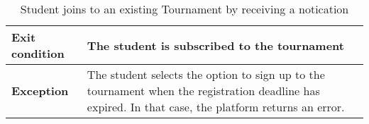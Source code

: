 \begin{enumerate}[label=\textbf{UC\arabic*}:,ref=UC\arabic*,leftmargin=1.3cm]
{\begin{table}[H]
\begin{tabular}{|l|p{11.9cm}|}
                        \textbf{Exit condition}  & The student is subscribed to the tournament                                                             \\\hline
                        \textbf{Exception}       & The student selects the option to sign up to the tournament when the registration deadline has expired.
                        In that case, the platform returns an error.                                                                                       \\\hline
                  \end{tabular}
                  \caption{Student joins to an existing Tournament by receiving a notication}
                  \label{table:Student joins to an existing Tournament by receiving a notication}
            \end{table}
            \begin{adjustbox}{
                        max size={\textwidth}{},
                        caption={Student joins to an existing Tournament by receiving a notication},
                        label={fig:Student joins to an existing Tournament by receiving a notication},
                        figure=H}
                  \centering
            \end{adjustbox}
            \pagebreak
      }
\end{enumerate}
